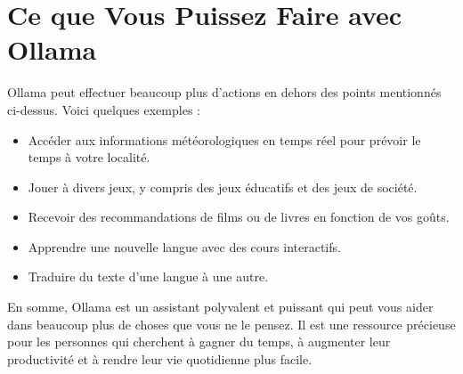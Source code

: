 \documentclass[12pt]{article}
\begin{document}
\section*{Ce que Vous Puissez Faire avec Ollama}

Ollama peut effectuer beaucoup plus d'actions en dehors des points mentionnés ci-dessus. Voici quelques exemples :

\begin{itemize}
    \item Accéder aux informations météorologiques en temps réel pour prévoir le temps à votre localité.
    \item Jouer à divers jeux, y compris des jeux éducatifs et des jeux de société.
    \item Recevoir des recommandations de films ou de livres en fonction de vos goûts.
    \item Apprendre une nouvelle langue avec des cours interactifs.
    \item Traduire du texte d'une langue à une autre.
\end{itemize}

En somme, Ollama est un assistant polyvalent et puissant qui peut vous aider dans beaucoup plus de choses que vous ne le pensez. Il est une ressource précieuse pour les personnes qui cherchent à gagner du temps, à augmenter leur productivité et à rendre leur vie quotidienne plus facile.
\end{document}
